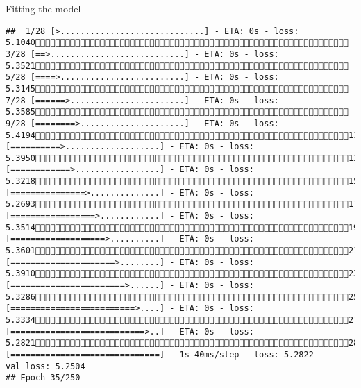 \documentclass[
  ignorenonframetext,
]{beamer}
\begin{document}
\begin{frame}[fragile]{Fitting the model}
\begin{verbatim}
##  1/28 [>.............................] - ETA: 0s - loss: 5.1040 3/28 [==>...........................] - ETA: 0s - loss: 5.3521 5/28 [====>.........................] - ETA: 0s - loss: 5.3145 7/28 [======>.......................] - ETA: 0s - loss: 5.3585 9/28 [========>.....................] - ETA: 0s - loss: 5.419411/28 [==========>...................] - ETA: 0s - loss: 5.395013/28 [============>.................] - ETA: 0s - loss: 5.321815/28 [===============>..............] - ETA: 0s - loss: 5.269317/28 [=================>............] - ETA: 0s - loss: 5.351419/28 [===================>..........] - ETA: 0s - loss: 5.360121/28 [=====================>........] - ETA: 0s - loss: 5.391023/28 [=======================>......] - ETA: 0s - loss: 5.328625/28 [=========================>....] - ETA: 0s - loss: 5.333427/28 [===========================>..] - ETA: 0s - loss: 5.282128/28 [==============================] - 1s 40ms/step - loss: 5.2822 - val_loss: 5.2504
## Epoch 35/250

\end{verbatim}
\end{frame}
\end{document}
